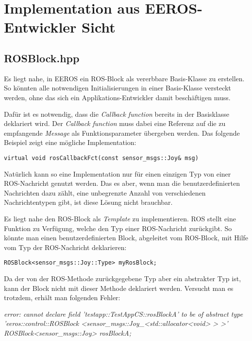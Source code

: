 \chapter{Implementation aus EEROS-Entwickler Sicht}


\section{ROSBlock.hpp}
Es liegt nahe, in EEROS ein ROS-Block als vererbbare Basis-Klasse zu erstellen.
So könnten alle notwendigen Initialisierungen in einer Basis-Klasse versteckt werden, ohne das sich ein Applikations-Entwickler damit beschäftigen muss.

Dafür ist es notwendig, dass die \textit{Callback function} bereits in der Basisklasse deklariert wird.
Der \textit{Callback function} muss dabei eine Referenz auf die zu empfangende \textit{Message} als Funktionsparameter übergeben werden.
Das folgende Beispiel zeigt eine mögliche Implementation:

\lstset{language=C++}
\begin{lstlisting}
virtual void rosCallbackFct(const sensor_msgs::Joy& msg)
\end{lstlisting}

Natürlich kann so eine Implementation nur für einen einzigen Typ von einer ROS-Nachricht genutzt werden.
Das es aber, wenn man die benutzerdefinierten Nachrichten dazu zählt, eine unbegrenzte Anzahl von verschiedenen Nachrichtentypen gibt, ist diese Lösung nicht brauchbar. %

Es liegt nahe den ROS-Block als \textit{Template} zu implementieren.
ROS stellt eine Funktion zu Verfügung, welche den Typ einer ROS-Nachricht zurückgibt.
So könnte man einen benutzerdefinierten Block, abgeleitet vom ROS-Block, mit Hilfe vom Typ der ROS-Nachricht deklarieren:

\lstset{language=C++}
\begin{lstlisting}
ROSBlock<sensor_msgs::Joy::Type> myRosBlock;
\end{lstlisting}

Da der von der ROS-Methode zurückgegebene Typ aber ein abstrakter Typ ist, kann der Block nicht mit dieser Methode deklariert werden.
Versucht man es trotzdem, erhält man folgenden Fehler:

\textit{
error: cannot declare field 'testapp::TestAppCS::rosBlockA' to be of abstract type 'eeros::control::ROSBlock
<sensor\_msgs::Joy\_<std::allocator<void> > >'\\
\-\hspace{2cm} ROSBlock<sensor\_msgs::Joy> rosBlockA;
}
